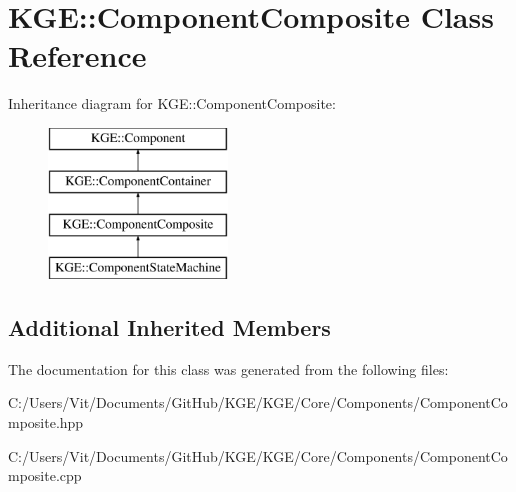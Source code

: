 \hypertarget{class_k_g_e_1_1_component_composite}{\section{K\-G\-E\-:\-:Component\-Composite Class Reference}
\label{class_k_g_e_1_1_component_composite}
}
Inheritance diagram for K\-G\-E\-:\-:Component\-Composite\-:\begin{figure}[H]
\begin{center}
\leavevmode
\includegraphics[height=4.000000cm]{class_k_g_e_1_1_component_composite}
\end{center}
\end{figure}
\subsection*{Additional Inherited Members}


The documentation for this class was generated from the following files\-:\begin{DoxyCompactItemize}
\item 
C\-:/\-Users/\-Vit/\-Documents/\-Git\-Hub/\-K\-G\-E/\-K\-G\-E/\-Core/\-Components/Component\-Composite.\-hpp\item 
C\-:/\-Users/\-Vit/\-Documents/\-Git\-Hub/\-K\-G\-E/\-K\-G\-E/\-Core/\-Components/Component\-Composite.\-cpp\end{DoxyCompactItemize}
